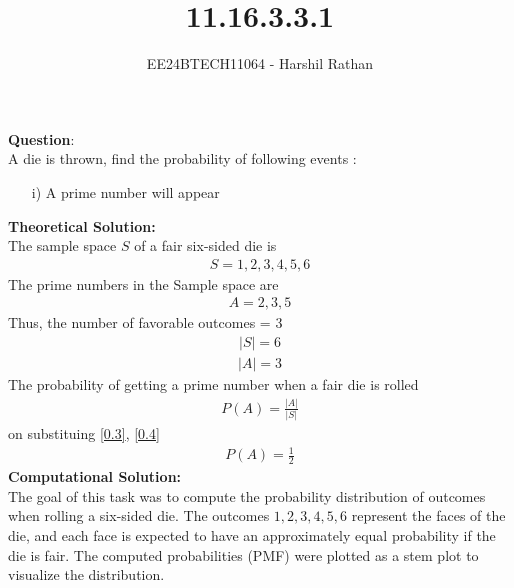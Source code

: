 \documentclass[journal]{IEEEtran}
\begin{document}

\vspace{3cm}

\title{11.16.3.3.1}
\author{EE24BTECH11064 - Harshil Rathan}
 \maketitle
{\let\newpage\relax\maketitle}

\renewcommand{\thefigure}{\theenumi}
\renewcommand{\thetable}{\theenumi}
\setlength{\intextsep}{10pt} %


\renewcommand{\thetable}{\theenumi}
\textbf{Question}:\\
A die is thrown, find the probability of following events : 
\begin{itemize}
    \item[i)] A prime number will appear 
\end{itemize}
\textbf{Theoretical Solution: }\\
The sample space $S$ of a fair six-sided die is
\begin{align}
    S = {1,2,3,4,5,6}
\end{align}
The prime numbers in the Sample space are 
\begin{align}
    A = {2,3,5}
\end{align}
Thus, the number of favorable outcomes = 3 
\begin{align}
    |S| = 6 
    \label{0.3}
\end{align}
\begin{align}
    |A| = 3 
    \label{0.4}
\end{align}
The probability of getting a prime number when a fair die is rolled
\begin{align}
    P(A) = \frac{|A|}{|S|}   
\end{align}
on substituing \ref{0.3}, \ref{0.4}
\begin{align}
    P(A) = \frac{1}{2}
\end{align}
\textbf{Computational Solution: }\\
The goal of this task was to compute the probability distribution of outcomes when rolling a six-sided die. The outcomes \(1, 2, 3, 4, 5, 6\) represent the faces of the die, and each face is expected to have an approximately equal probability if the die is fair. The computed probabilities (PMF) were plotted as a stem plot to visualize the distribution.
\end{document}
